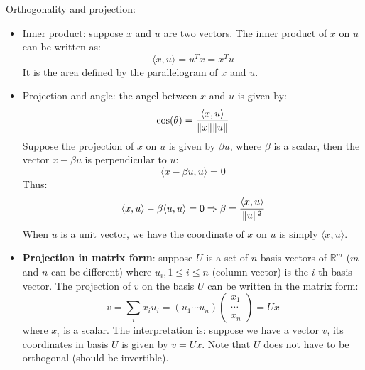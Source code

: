 \documentclass{report}
\begin{document}
Orthogonality and projection: 
\begin{itemize}
\item Inner product: suppose $x$ and $u$ are two vectors. The inner product of $x$ on $u$ can be written as: 
\begin{equation}
\langle x, u \rangle = u^T x = x^T u	
\end{equation}
It is the area defined by the parallelogram of $x$ and $u$. 

\item Projection and angle: the angel between $x$ and $u$ is given by: 
\begin{equation}
\cos(\theta) = \frac{\langle x, u \rangle}{ \lVert x\rVert \lVert u\rVert}	
\end{equation}
Suppose the projection of $x$ on $u$ is given by $\beta u$, where $\beta$ is a scalar, then the vector $x - \beta u$ is perpendicular to $u$: 
\begin{equation}
\langle x - \beta u, u \rangle = 0	
\end{equation}
Thus: 
\begin{equation}
\label{eq:projection}
\langle x, u \rangle - \beta \langle u, u \rangle = 0	\Rightarrow \beta = \frac{\langle x, u \rangle}{ \lVert u\rVert^2}
\end{equation}
When $u$ is a unit vector, we have the coordinate of $x$ on $u$ is simply $\langle x, u \rangle$. 

\item \textbf{Projection in matrix form}: suppose $U$ is a set of $n$ basis vectors of $\mathbb{R}^m$ ($m$ and $n$ can be different) where $u_i, 1 \leq i \leq n$ (column vector) is the $i$-th basis vector. The projection of $v$ on the basis $U$ can be written in the matrix form: 
\begin{equation}
v = \sum_i x_i u_i = (u_1 \cdots u_n) \left( \begin{array}{c} x_1\\ \cdots \\ x_n \end{array} \right) = U x
\end{equation}
where $x_i$ is a scalar. The interpretation is: suppose we have a vector $v$, its coordinates in basis $U$ is given by $v = Ux$. Note that $U$ does not have to be orthogonal (should be invertible). 


\end{itemize}
\end{document}
